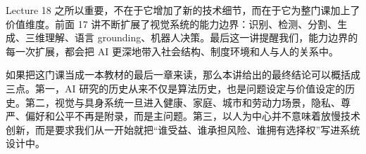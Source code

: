 \documentclass[a4paper]{article}
\begin{document}
Lecture 18 之所以重要，不在于它增加了新的技术细节，而在于它为整门课加上了价值维度。前面 17 讲不断扩展了视觉系统的能力边界：识别、检测、分割、生成、三维理解、语言 grounding、机器人决策。最后这一讲提醒我们，能力边界的每一次扩展，都会把 AI 更深地带入社会结构、制度环境和人与人的关系中。

如果把这门课当成一本教材的最后一章来读，那么本讲给出的最终结论可以概括成三点。第一，AI 研究的历史从来不仅是算法历史，也是问题设定与价值设定的历史。第二，视觉与具身系统一旦进入健康、家庭、城市和劳动力场景，隐私、尊严、偏好和公平不再是附录，而是主问题。第三，以人为中心并不意味着放慢技术创新，而是要求我们从一开始就把“谁受益、谁承担风险、谁拥有选择权”写进系统设计中。
\end{document}
